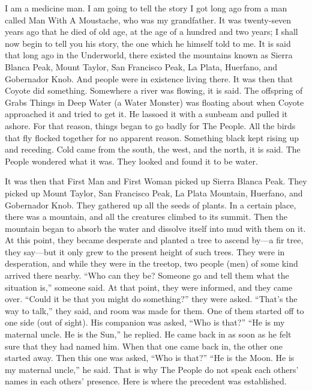 I am a medicine man. I am going to tell the story I got long ago from a man called Man With A Moustache, who was my grandfather. It was twenty-seven years ago that he died of old age, at the age of a hundred and two years; I shall now begin to tell you his story, the one which he himself told to me. It is said that long ago in the Underworld, there existed the mountains known as Sierra Blanca Peak, Mount Taylor, San Francisco Peak, La Plata, Huerfano, and Gobernador Knob. And people were in existence living there. It was then that Coyote did something. Somewhere a river was flowing, it is said. The offspring of Grabs Things in Deep Water (a Water Monster) was floating about when Coyote approached it and tried to get it. He lassoed it with a sunbeam and pulled it ashore. For that reason, things began to go badly for The People. All the birds that fly flocked together for no apparent reason. Something black kept rising up and receding. Cold came from the south, the west, and the north, it is said. The People wondered what it was. They looked and found it to be water.

It was then that First Man and First Woman picked up Sierra Blanca Peak. They picked up Mount Taylor, San Francisco Peak, La Plata Mountain, Huerfano, and Gobernador Knob. They gathered up all the seeds of plants. In a certain place, there was a mountain, and all the creatures climbed to its summit. Then the mountain began to absorb the water and dissolve itself into mud with them on it. At this point, they became desperate and planted a tree to ascend by—a fir tree, they say—but it only grew to the present height of such trees. They were in desperation, and while they were in the treetop, two people (men) of some kind arrived there nearby. ``Who can they be? Someone go and tell them what the situation is,'' someone said. At that point, they were informed, and they came over. ``Could it be that you might do something?'' they were asked. ``That's the way to talk,'' they said, and room was made for them. One of them started off to one side (out of sight). His companion was asked, ``Who is that?'' ``He is my maternal uncle. He is the Sun,'' he replied. He came back in as soon as he felt sure that they had named him. When that one came back in, the other one started away. Then this one was asked, ``Who is that?'' ``He is the Moon. He is my maternal uncle,'' he said. That is why The People do not speak each others' names in each others' presence. Here is where the precedent was established.

